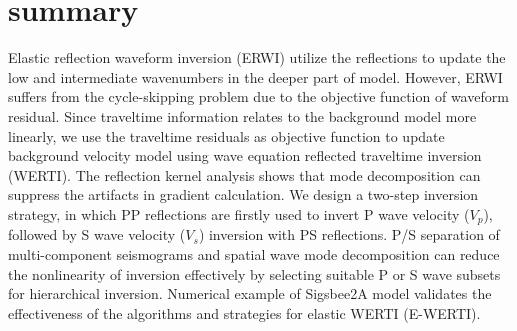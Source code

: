 \section{summary}
Elastic reflection waveform inversion (ERWI) utilize the reflections to update the low and
intermediate wavenumbers in the
deeper part of model. However, ERWI suffers from
the cycle-skipping problem due to the objective function of waveform residual. Since traveltime
information relates to the background model more linearly, 
we use the traveltime
residuals as objective function to 
update background velocity model using
wave equation reflected traveltime inversion (WERTI). 
The reflection kernel analysis shows that mode decomposition can suppress the artifacts in
gradient calculation. 
We design a two-step inversion strategy, in which PP reflections are firstly used to invert P wave
velocity ($V_p$),
followed by S wave velocity ($V_s$) inversion with PS reflections. %
P/S separation of multi-component seismograms and spatial wave mode decomposition %
can reduce the nonlinearity of inversion effectively by selecting suitable P or S wave subsets for
hierarchical inversion.
Numerical example of Sigsbee2A model validates the effectiveness of the 
algorithms and strategies for elastic WERTI (E-WERTI).

